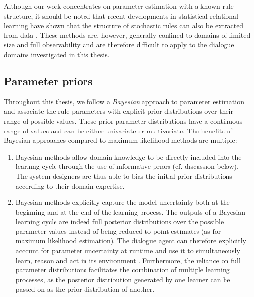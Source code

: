 Although our work concentrates on parameter estimation  with a known rule structure, it should be noted that recent developments in statistical relational learning have shown that the structure of stochastic rules can also be extracted from data \citep{PasulaZK07,Kok:2009}.  These methods are, however, generally confined to domains of limited size and full observability and are therefore difficult to apply to the dialogue domains investigated in this thesis.  


\subsection{Parameter priors}
\label{sec:rule-params-priors}

Throughout this thesis, we follow a \textit{Bayesian} approach to parameter estimation and associate the rule parameters with explicit prior distributions over their range of possible values.  These prior parameter distributions have a continuous range of values and can be either univariate or multivariate.  The benefits of Bayesian approaches compared to maximum likelihood methods are multiple:
\begin{enumerate} 
\item Bayesian methods allow domain knowledge to be directly included into the learning cycle through the use of informative priors (cf. discussion below). The system designers are thus able to bias the initial prior distributions according to their domain expertise.
\item Bayesian methods explicitly capture the model uncertainty both at the beginning and at the end of the learning process. The outputs of a Bayesian learning cycle are indeed full posterior distributions over the possible parameter values instead of being reduced to point estimates (as for maximum likelihood estimation).  The dialogue agent can therefore explicitly account for parameter uncertainty at runtime and use it to simultaneously learn, reason and act in its environment \citep{Ross:2011}. Furthermore, the reliance on full parameter distributions facilitates the combination of multiple learning processes, as the posterior distribution generated by one learner can be passed on as the prior distribution of another. 
\end{enumerate}

